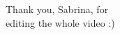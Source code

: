 \documentclass[preview]{standalone}
\begin{document}
\begin{center}
Thank you, Sabrina, for\\editing the whole video :)
\end{center}
\end{document}
